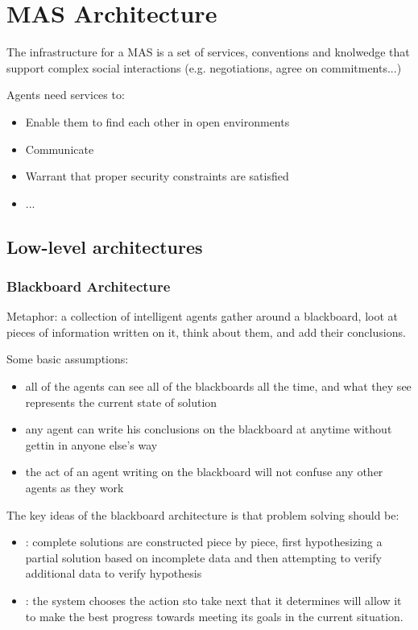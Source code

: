 \chapter{MAS Architecture}
\minitoc

The infrastructure for a MAS is a set of services, conventions and knolwedge that support complex social interactions (e.g. negotiations, agree on commitments...)

Agents need services to:
\begin{itemize}
\item Enable them to find each other in open environments
\item Communicate 
\item Warrant that proper security constraints are satisfied
\item ...
\end{itemize}
\section{Low-level architectures}
\subsection{Blackboard Architecture}
Metaphor: a collection of intelligent agents gather around a blackboard, loot at pieces of information written on it, think about them, and add their conclusions.

Some basic assumptions:
\begin{itemize}
\item all of the agents can  see all of the blackboards all the time, and what they see represents the current state of solution
\item any agent can write his conclusions on the blackboard at anytime without gettin in anyone else's way
\item the act of an agent writing on the blackboard will not confuse any other agents as they work
\end{itemize}
The key ideas of the blackboard architecture is that problem solving should be:
\begin{itemize}
\item {}: complete solutions are constructed piece by piece, first hypothesizing a partial solution based on incomplete data and then attempting to verify additional data to verify hypothesis
\item {}: the system chooses the action sto take next that it determines will allow it to make the best progress towards meeting its goals in the current situation.
\end{itemize}

